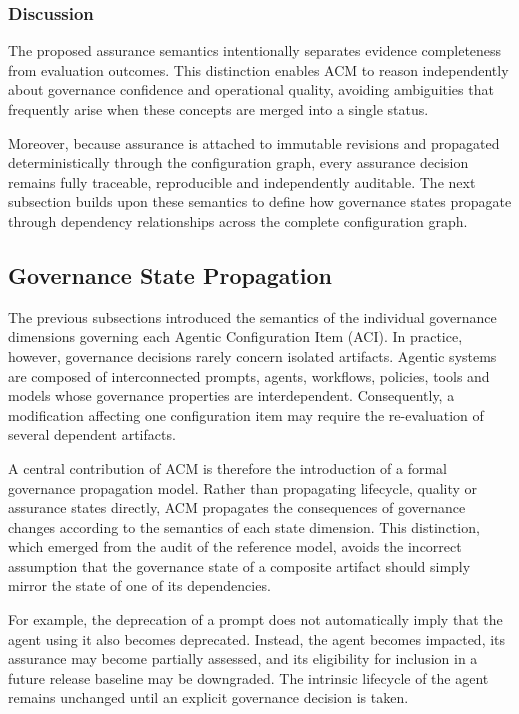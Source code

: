 \documentclass[10pt]{article}
\begin{document}
\subsubsection{Discussion}

The proposed assurance semantics intentionally separates evidence completeness
from evaluation outcomes. This distinction enables ACM to reason independently
about governance confidence and operational quality, avoiding ambiguities that
frequently arise when these concepts are merged into a single status.

Moreover, because assurance is attached to immutable revisions and propagated
deterministically through the configuration graph, every assurance decision
remains fully traceable, reproducible and independently auditable. The next
subsection builds upon these semantics to define how governance states
propagate through dependency relationships across the complete configuration
graph.

\subsection{Governance State Propagation}
\label{subsec:governance_state_propagation}

The previous subsections introduced the semantics of the individual governance
dimensions governing each Agentic Configuration Item (ACI). In practice,
however, governance decisions rarely concern isolated artifacts. Agentic
systems are composed of interconnected prompts, agents, workflows, policies,
tools and models whose governance properties are interdependent. Consequently,
a modification affecting one configuration item may require the re-evaluation
of several dependent artifacts.

A central contribution of ACM is therefore the introduction of a formal
governance propagation model. Rather than propagating lifecycle, quality or
assurance states directly, ACM propagates the consequences of governance
changes according to the semantics of each state dimension. This distinction,
which emerged from the audit of the reference model, avoids the incorrect
assumption that the governance state of a composite artifact should simply
mirror the state of one of its dependencies.

For example, the deprecation of a prompt does not automatically imply that the
agent using it also becomes deprecated. Instead, the agent becomes impacted,
its assurance may become partially assessed, and its eligibility for inclusion
in a future release baseline may be downgraded. The intrinsic lifecycle of the
agent remains unchanged until an explicit governance decision is taken.
\end{document}
